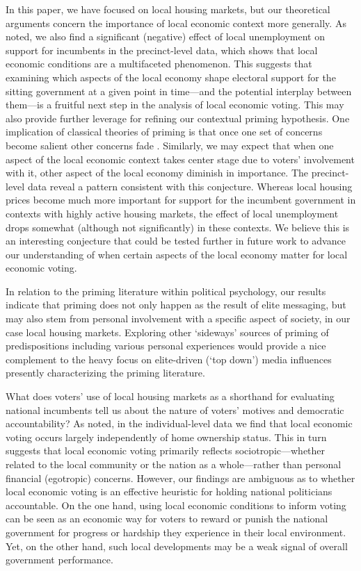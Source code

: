 \documentclass[12pt,a4paper]{article}
\begin{document}
	In this paper, we have focused on local housing markets, but our theoretical arguments concern the importance of local economic context more generally. As noted, we also find a significant (negative) effect of local unemployment on support for incumbents in the precinct-level data, which shows that local economic conditions are a multifaceted phenomenon. This suggests that examining which aspects of the local economy shape electoral support for the sitting government at a given point in time—and the potential interplay between them—is a fruitful next step in the analysis of local economic voting. This may also provide further leverage for refining our contextual priming hypothesis. One implication of classical theories of priming is that once one set of concerns become salient other concerns fade \citep{ krosnick1990altering}. Similarly, we may expect that when one aspect of the local economic context takes center stage due to voters’ involvement with it, other aspect of the local economy diminish in importance. The precinct-level data reveal a pattern consistent with this conjecture. Whereas local housing prices become much more important for support for the incumbent government in contexts with highly active housing markets, the effect of local unemployment drops somewhat (although not significantly) in these contexts. We believe this is an interesting conjecture that could be tested further in future work to advance our understanding of when certain aspects of the local economy matter for local economic voting.
	
	In relation to the priming literature within political psychology, our results indicate that priming does not only happen as the result of elite messaging, but may also stem from personal involvement with a specific aspect of society, in our case local housing markets. Exploring other `sideways’ sources of priming of predispositions including various personal experiences would provide a nice complement to the heavy focus on elite-driven (‘top down’) media influences presently characterizing the priming literature. 
	
	What does voters’ use of local housing markets as a shorthand for evaluating national incumbents tell us about the nature of voters’ motives and democratic accountability? As noted, in the individual-level data we find that local economic voting occurs largely independently of home ownership status. This in turn suggests that local economic voting primarily reflects sociotropic—whether related to the local community or the nation as a whole—rather than personal financial (egotropic) concerns. However, our findings are ambiguous as to whether local economic voting is an effective heuristic for holding national politicians accountable. On the one hand, using local economic conditions to inform voting can be seen as an economic way for voters to reward or punish the national government for progress or hardship they experience in their local environment. Yet, on the other hand, such local developments may be a weak signal of overall government performance.
	
\end{document}
